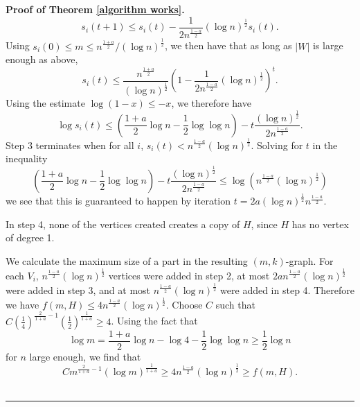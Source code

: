 \documentclass[12pt]{article}%
\newenvironment{proof}[1][Proof]{\noindent\textbf{#1.} }
{\hfill \ \rule{0.5em}{0.5em}}
\begin{document}
\begin{proof}[Proof of Theorem \ref{algorithm works}]
$$s_i(t+1)\le s_i(t)-\frac{1}{2n^\frac{1-a}{2}}(\log n)^{\frac{1}{2}}s_i(t).$$
Using $s_i(0)\le m\le n^\frac{1+a}{2}/(\log n)^{\frac{1}{2}}$, we then have that as long as $|W|$ is large enough as above, 
$$s_i(t)\le \frac{n^{\frac{1+a}{2}}}{(\log n)^{\frac{1}{2}}}\left(1-\frac{1}{2n^\frac{1-a}{2}}(\log n)^{\frac{1}{2}}\right)^t.$$
Using the estimate $\log(1-x)\le -x$, we therefore have
$$\log s_i(t)\le\left(\frac{1+a}{2}\log n-\frac{1}{2}\log\log n\right)-t\frac{(\log n)^{\frac{1}{2}}}{2n^{\frac{1-a}{2}}}.$$
Step 3 terminates when for all $i$, $s_i(t) < n^{\frac{1-a}{2}}(\log n)^{\frac{1}{2}}$. Solving for $t$ in the inequality
$$\left(\frac{1+a}{2}\log n-\frac{1}{2}\log\log n\right)-t\frac{(\log n)^{\frac{1}{2}}}{2n^{\frac{1-a}{2}}}\le\log\left(n^{\frac{1-a}{2}}(\log n)^{\frac{1}{2}}\right)$$
we see that this is guaranteed to happen by iteration $t=2a(\log n)^{\frac{1}{2}}n^{\frac{1-a}{2}}.$

In step 4, none of the vertices created creates a copy of $H$, since $H$ has no vertex of degree 1. 

We calculate the maximum size of a part in the resulting $(m,k)$-graph. For each $V_i$, $n^{\frac{1-a}{2}}(\log n)^{\frac{1}{2}}$ vertices were added in step 2, at most $2an^{\frac{1-a}{2}}(\log n)^{\frac{1}{2}}$ were added in step 3, and at most $n^{\frac{1-a}{2}}(\log n)^{\frac{1}{2}}$ were added in step 4. Therefore we have $f(m,H)\le 4n^{\frac{1-a}{2}}(\log n)^{\frac{1}{2}}$. Choose $C$ such that $C\left(\frac{1}{4}\right)^{\frac{2}{1+a}-1}\left(\frac{1}{2}\right)^{\frac{1}{1+a}}\ge 4$. Using the fact that
$$\log m=\frac{1+a}{2}\log n-\log4-\frac{1}{2}\log\log n\ge\frac{1}{2}\log n$$
for $n$ large enough, we find that
$$Cm^{\frac{2}{1+a}-1}(\log m)^{\frac{1}{1+a}}\ge 4n^{\frac{1-a}{2}}(\log n)^{\frac{1}{2}}\ge f(m,H).$$
\end{proof}

\bigskip

\end{document}
